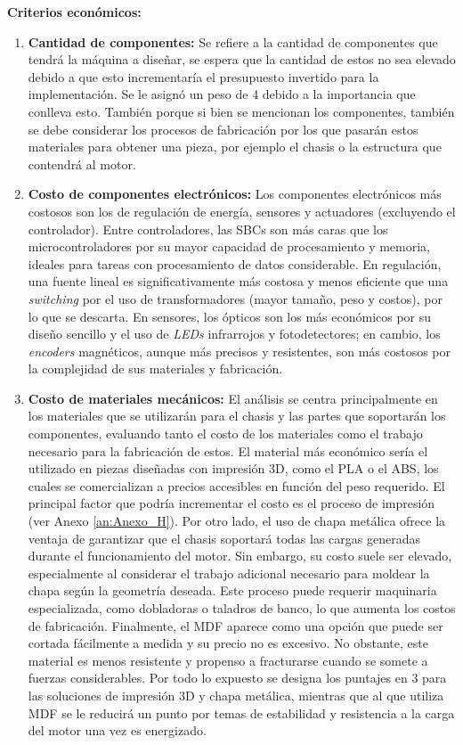 \textbf{Criterios económicos:}
\begin{enumerate}
    \item \textbf{Cantidad de componentes:} Se refiere a la cantidad de componentes que tendrá la máquina a diseñar, se espera que la cantidad de estos no sea elevado debido a que esto incrementaría el presupuesto invertido para la implementación. Se le asignó un peso de 4 debido a la importancia que conlleva esto. También porque si bien se mencionan los componentes, también se debe considerar los procesos de fabricación por los que pasarán estos materiales para obtener una pieza, por ejemplo el chasis o la estructura que contendrá al motor.

    \item \textbf{Costo de componentes electrónicos:} Los componentes electrónicos más costosos son los de regulación de energía, sensores y actuadores (excluyendo el controlador). Entre controladores, las \ac{SBC}s son más caras que los microcontroladores por su mayor capacidad de procesamiento y memoria, ideales para tareas con procesamiento de datos considerable. En regulación, una fuente lineal es significativamente más costosa y menos eficiente que una \textit{switching} por el uso de transformadores (mayor tamaño, peso y costos), por lo que se descarta. En sensores, los ópticos son los más económicos por su diseño sencillo y el uso de \textit{LEDs} infrarrojos y fotodetectores; en cambio, los \textit{encoders} magnéticos, aunque más precisos y resistentes, son más costosos por la complejidad de sus materiales y fabricación.

    
    \item \textbf{Costo de materiales mecánicos:} El análisis se centra principalmente en los materiales que se utilizarán para el chasis y las partes que soportarán los componentes, evaluando tanto el costo de los materiales como el trabajo necesario para la fabricación de estos. El material más económico sería el utilizado en piezas diseñadas con impresión 3D, como el PLA o el ABS, los cuales se comercializan a precios accesibles en función del peso requerido. El principal factor que podría incrementar el costo es el proceso de impresión (ver Anexo \ref{an:Anexo_H}). Por otro lado, el uso de chapa metálica ofrece la ventaja de garantizar que el chasis soportará todas las cargas generadas durante el funcionamiento del motor. Sin embargo, su costo suele ser elevado, especialmente al considerar el trabajo adicional necesario para moldear la chapa según la geometría deseada. Este proceso puede requerir maquinaria especializada, como dobladoras o taladros de banco, lo que aumenta los costos de fabricación. Finalmente, el MDF aparece como una opción que puede ser cortada fácilmente a medida y su precio no es excesivo. No obstante, este material es menos resistente y propenso a fracturarse cuando se somete a fuerzas considerables. Por todo lo expuesto se designa los puntajes en 3 para las soluciones de impresión 3D y chapa metálica, mientras que al que utiliza MDF se le reducirá un punto por temas de estabilidad y resistencia a la carga del motor una vez es energizado.
    

\end{enumerate}
